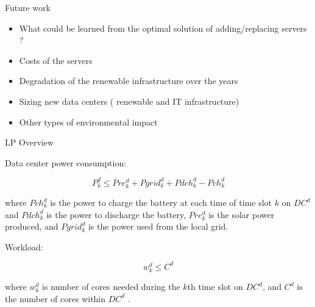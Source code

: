 \documentclass[Ligatures=TeX,table,svgnames,usetotalslideindicator,compress,10pt]{beamer}
\begin{document}
\begin{frame}{Future work}


  \begin{itemize}
   
  \item What could be learned from the optimal solution of adding/replacing servers ?
  \item Costs of the servers     
  \item Degradation of the renewable infrastructure over the years
  \item Sizing new data centers ( renewable and IT infrastructure)
  \item Other types of environmental impact
    
  \end{itemize}    
\end{frame}


\begin{frame}[allowframebreaks]  
  \printbibliography
\end{frame}

\appendix

\begin{frame}{LP Overview}

  \alert{ Data center power consumption:}
  
  \begin{equation}
    P^d_k \leq Pre^d_k + Pgrid^d_k + Pdch_k^d - Pch_k^d   
  \end{equation}


  where $Pch_k^d$ is the power to charge the battery at each time of time slot $k$ on $DC^d$ and $Pdch_k^d$ is the power to discharge the battery, $Pre^d_k $ is the solar power produced, and $ Pgrid^d_k $ is the power used from the local grid.

  \alert{Workload:}
  
  \begin{equation} \label{eq:wk}
    w_k^d \leq C^d
  \end{equation}
  
  where $w_k^d$ is number of cores needed during the $k$th time slot on $DC^d$,  and  $C^d$ is the number of cores within $DC^d$ .
  
\end{frame}
\end{document}
